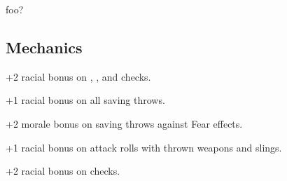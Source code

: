 
foo?

\subsection{Mechanics}

\begin{itemize*}
\item {}
\item {}
\item {}
\item {}
\item +2 racial bonus on , , and  checks.
\item +1 racial bonus on all saving throws.
\item +2 morale bonus on saving throws against Fear effects.
\item +1 racial bonus on attack rolls with thrown weapons and slings.
\item +2 racial bonus on  checks.
\item {}
\item {}
\item {}
\end{itemize*}

